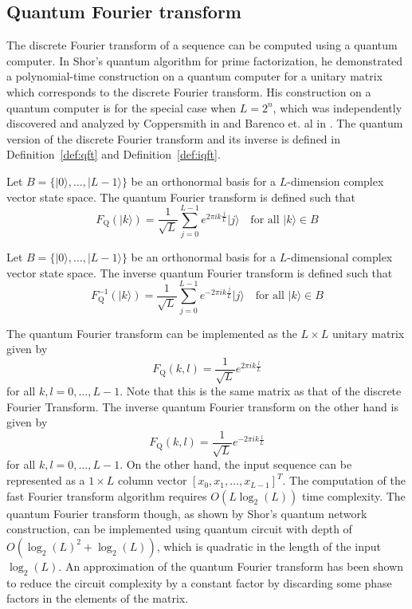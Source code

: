 \subsection{Quantum Fourier transform}\label{subsec:qft}
The discrete Fourier transform of a sequence can be computed using a quantum computer. In Shor's quantum algorithm for prime factorization\cite{Shor1994}, he demonstrated a polynomial-time construction on a quantum computer for a unitary matrix which corresponds to the discrete Fourier transform. His construction on a quantum computer is for the special case when $L=2^n$, which was independently discovered and analyzed by Coppersmith in \cite{Coppersmith1994} and Barenco et. al in \cite{Barenco1996}. The quantum version of the discrete Fourier transform and its inverse is defined in Definition~\ref{def:qft} and Definition~\ref{def:iqft}.

\begin{definition}\label{def:qft}
	Let $B=\{\vert 0 \rangle, \ldots, \vert L-1 \rangle\}$ be an orthonormal basis for a $L$-dimension complex vector state space. The quantum Fourier transform is defined such that
	\[
		F_{\mathrm{Q}}\left(\vert k \rangle\right) = \frac{1}{\sqrt{L}} \sum_{j=0}^{L-1} e^{2\pi i k \frac{j}{L}} \vert j \rangle \ \ \ \text{ for all } \vert k \rangle \in B
	\]
\end{definition}

\begin{definition}\label{def:iqft}
	Let $B=\{\vert 0 \rangle, \ldots, \vert L-1 \rangle\}$ be an orthonormal basis for a $L$-dimensional complex vector state space. The inverse quantum Fourier transform is defined such that
	\[
		F_{\mathrm{Q}}^{-1}\left(\vert k \rangle\right) = \frac{1}{\sqrt{L}} \sum_{j=0}^{L-1} e^{-2\pi i k \frac{j}{L}} \vert j \rangle \ \ \ \text{ for all } \vert k \rangle \in B
	\]
\end{definition}
The quantum Fourier transform can be implemented as the $L \times L$ unitary matrix given by
\[
	F_{\mathrm{Q}}(k,l) = \frac{1}{\sqrt{L}} e^{2\pi i k\frac{l}{L}}
\]
for all $k,l=0,\ldots,L-1$. Note that this is the same matrix as that of the discrete Fourier Transform. The inverse quantum Fourier transform on the other hand is given by 
\[
	F_{\mathrm{Q}}(k,l) = \frac{1}{\sqrt{L}} e^{-2\pi i k\frac{l}{L}}
\]
for all $k,l=0,\ldots,L-1$. On the other hand, the input sequence can be represented as a $1 \times L$ column vector $\left[ x_0, x_1, \ldots, x_{L-1} \right]^T$. The computation of the fast Fourier transform algorithm requires $O\left(L\log_2(L)\right)$ time complexity. The quantum Fourier transform though, as shown by Shor's quantum network construction, can be implemented using quantum circuit with depth of $O\left( \log_2(L)^2 + \log_2(L) \right)$, which is quadratic in the length of the input $\log_2(L)$. An approximation of the quantum Fourier transform has been shown to reduce the circuit complexity by a constant factor \cite{Coppersmith1994} by discarding some phase factors in the elements of the matrix. 


